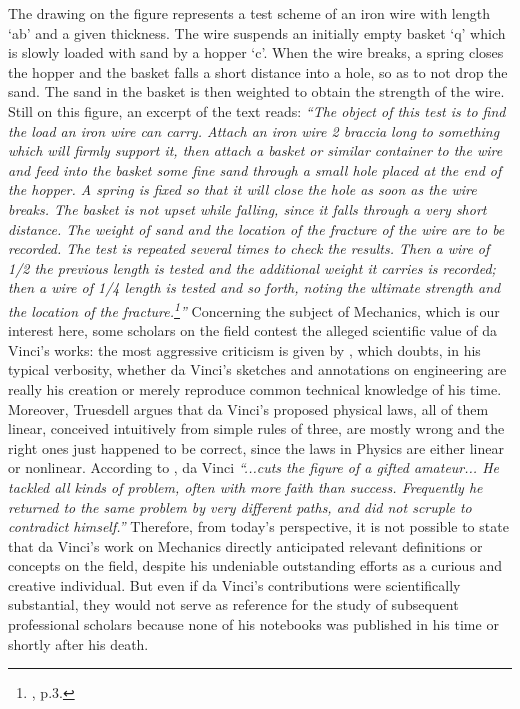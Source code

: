 The drawing on the figure represents a test scheme of an iron wire with length `ab' and a given thickness. The wire suspends an initially empty basket `q' which is slowly loaded with sand by a hopper `c'. When the wire breaks, a spring closes the hopper and the basket falls a short distance into a hole, so as to not drop the sand. The sand in the basket is then weighted to obtain the strength of the wire. Still on this figure, an excerpt of the text reads: \emph{``The object of this test is to find the load an iron wire can carry. Attach an iron wire 2 braccia long to something which will firmly support it, then attach a basket or similar container to the wire and feed into the basket some fine sand through a small hole placed at the end of the hopper. A spring is fixed so that it will close the hole as soon as the wire breaks. The basket is not upset while falling, since it falls through a very short distance. The weight of sand and the location of the fracture of the wire are to be recorded. The test is repeated several times to check the results. Then a wire of 1/2 the previous length is tested and the additional weight it carries is recorded; then a wire of 1/4 length is tested and so forth, noting the ultimate strength and the location of the fracture.\footnote{\cite{lund_2000_1}, p.3.}''}       
Concerning the subject of Mechanics, which is our interest here, some scholars on the field contest the alleged scientific value of da Vinci's works: the most aggressive criticism is given by \cite{truesdell_1968}, which doubts, in his typical verbosity, whether da Vinci's sketches and annotations on engineering are really his creation or merely reproduce common technical knowledge of his time. Moreover, Truesdell argues that da Vinci's proposed physical laws, all of them linear, conceived intuitively from simple rules of three, are mostly wrong and the right ones just happened to be correct, since the laws in Physics are either linear or nonlinear. According to \cite{dugas_1988_1}, da Vinci \emph{``...cuts the figure of a gifted amateur... He tackled all kinds of problem, often with more faith than success. Frequently he returned to the same problem by very different paths, and did not scruple to contradict himself.''} Therefore, from today's perspective, it is not possible to state that da Vinci's work on Mechanics directly anticipated relevant definitions or concepts on the field, despite his undeniable outstanding efforts as a curious and creative individual. But even if da Vinci's contributions were scientifically substantial, they would not serve as reference for the study of subsequent professional scholars because none of his notebooks was published in his time or shortly after his death.  
